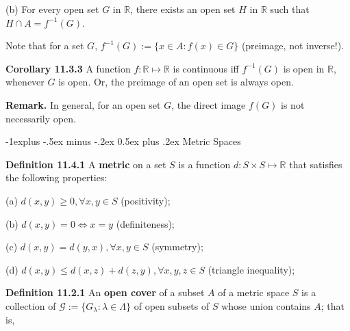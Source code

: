 \documentclass[10pt,landscape]{article}
\makeatletter
\renewcommand{\subsection}{\@startsection{subsection}{2}{0mm}%
                                {-1explus -.5ex minus -.2ex}%
                                {0.5ex plus .2ex}%
                                {\normalfont\normalsize\bfseries}}
\makeatother
\begin{document}
\begin{multicols}{4}
(b) For every open set $G$ in $\mathbb{R}$, there exists an open set $H$ in $\mathbb{R}$ such that $H \cap A = f^{-1}(G)$.

Note that for a set $G$, $f^{-1}(G) := \{ x \in A: f(x) \in G\}$ (preimage, not inverse!). 

\textbf{Corollary 11.3.3} A function $f: \mathbb{R} \mapsto \mathbb{R}$ is continuous iff $f^{-1}(G)$ is open in $\mathbb{R}$, whenever $G$ is open. Or, the preimage of an open set is always open.

\textbf{Remark.} In general, for an open set $G$, the direct image $f(G)$ is not necessarily open.

\subsection{Metric Spaces}

\textbf{Definition 11.4.1} A \textbf{metric} on a set $S$ is a function $d: S \times S \mapsto \mathbb{R}$ that satisfies the following properties:

(a) $d(x ,y) \geq 0, \forall x, y \in S$ (positivity);

(b) $d(x, y) = 0 \iff x = y$ (definiteness);

(c) $d(x, y) = d(y, x), \forall x, y \in S$ (symmetry);

(d) $d(x, y) \leq d(x, z) + d(z ,y), \forall x, y, z \in S$ (triangle inequality);







\textbf{Definition 11.2.1} An \textbf{open cover} of a subset $A$ of a metric space $S$ is a collection of $\mathcal{G} := \{ G_{\lambda}: \lambda \in \Lambda \}$ of open subsets of $S$ whose union contains $A$; that is, 


\end{multicols}
\end{document}
